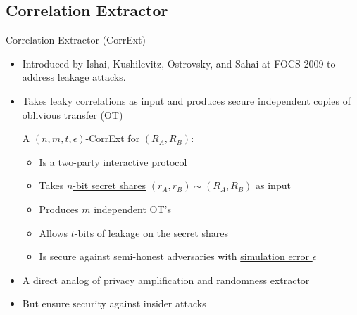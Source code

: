 \subsection{Correlation Extractor}
\begin{frame}{Correlation Extractor (CorrExt)}
	\begin{itemize}
		\item Introduced by Ishai, Kushilevitz, Ostrovsky, and Sahai at FOCS 2009 \cite{FOCS:IKOS09} to address leakage attacks. 
		\item Takes leaky correlations as input and produces secure independent
		copies of oblivious transfer (OT)
		\pause
		\begin{definition}
			A $ (n,m,t,\epsilon) $-CorrExt for $ (R_A, R_B) $: 
			\begin{itemize}
				\item Is a two-party interactive protocol	
				\item Takes \underline{$n$-bit secret shares} $ (r_A, r_B) \sim (R_A, R_B) $ as input
				\item Produces \underline{$ m $ independent OT's}
				\item Allows \underline{$ t $-bits of leakage} on the secret shares
				\item Is secure against semi-honest adversaries with \underline{simulation error $ \epsilon $}
			\end{itemize}
		\end{definition}
		\pause
		\item A direct analog of privacy amplification and randomness extractor
		\item But ensure security against insider attacks
	\end{itemize}
\end{frame}
	

